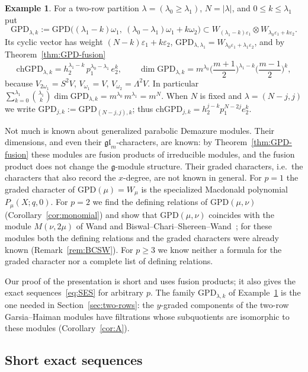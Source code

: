 \documentclass[11pt]{amsart}
\numberwithin{equation}{section}
\theoremstyle{definition}
\newtheorem{example}[equation]{Example}
\newcommand{\gl}{\mathfrak{gl}}
\newcommand{\fg}{\mathfrak{g}}
\newcommand{\GPD}{\mathrm{GPD}}         %
\newcommand{\eps}{\varepsilon}
\newcommand{\ch}{\mathrm{ch}}
\begin{document}
	\begin{example}\label{ex:GPD-two-rows}
		For a two-row partition $\lambda=(\lambda_0\ge\lambda_1)$, $N=|\lambda|$, and $0\le k\le\lambda_1$ put
		\[
		\GPD_{\lambda,k}:=\GPD\big((\lambda_1-k)\omega_1,\ (\lambda_0-\lambda_1)\omega_1+k\omega_2\big)\subset W_{(\lambda_1-k)\eps_1}\otimes W_{\lambda_0\eps_1+k\eps_2}.
		\]
		Its cyclic vector has weight $(N-k)\eps_1+k\eps_2$, $\GPD_{\lambda,\lambda_1}=W_{\lambda_0\eps_1+\lambda_1\eps_2}$, and by Theorem~\ref{thm:GPD-fusion}
		\[
		\ch\GPD_{\lambda,k}=h_2^{\lambda_1-k}\,p_1^{\lambda_0-\lambda_1}\,e_2^{k},\qquad \dim\GPD_{\lambda,k}=m^{\lambda_0}\Big(\frac{m+1}2\Big)^{\lambda_1-k}\Big(\frac{m-1}2\Big)^{k},
		\]
		because $V_{2\omega_1}=S^2V$, $V_{\omega_1}=V$, $V_{\omega_2}=\Lambda^2V$. In particular $\sum_{k=0}^{\lambda_1}\binom{\lambda_1}k\dim\GPD_{\lambda,k}=m^{\lambda_0}\,m^{\lambda_1}=m^N$.
		When $N$ is fixed and $\lambda=(N-j,j)$ we write $\GPD_{j,k}:=\GPD_{(N-j,j),k}$; thus $\ch\GPD_{j,k}=h_2^{j-k}p_1^{N-2j}e_2^k$.
	\end{example}
	
	
	Not much is known about generalized parabolic Demazure modules. Their dimensions, and even their $\gl_m$-characters, are known: by Theorem~\ref{thm:GPD-fusion} these modules are fusion products of irreducible modules, and the fusion product does not change the $\fg$-module structure. Their graded characters, i.e.\ the characters that also record the $x$-degree, are not known in general. For $p=1$ the graded character of $\GPD(\mu)=W_\mu$ is the specialized Macdonald polynomial $P_\mu(X;q,0)$. For $p=2$ we find the defining relations of $\GPD(\mu,\nu)$ (Corollary~\ref{cor:monomial}) and show that $\GPD(\mu,\nu)$ coincides with the module $M(\nu,2\mu)$ of Wand and Biswal--Chari--Shereen--Wand~\cite{Wand,BCSW}; for these modules both the defining relations and the graded characters were already known (Remark~\ref{rem:BCSW}). For $p\ge3$ we know neither a formula for the graded character nor a complete list of defining relations.
	
	Our proof of the presentation is short and uses fusion products; it also gives the exact sequences~\eqref{eq:SES} for arbitrary $p$. The family $\GPD_{\lambda,k}$ of Example~\ref{ex:GPD-two-rows} is the one needed in Section~\ref{sec:two-rows}: the $y$-graded components of the two-row Garsia--Haiman modules have filtrations whose subquotients are isomorphic to these modules (Corollary~\ref{cor:A}).
	
	\subsection{Short exact sequences}\label{ssec:SES}
	
\end{document}
